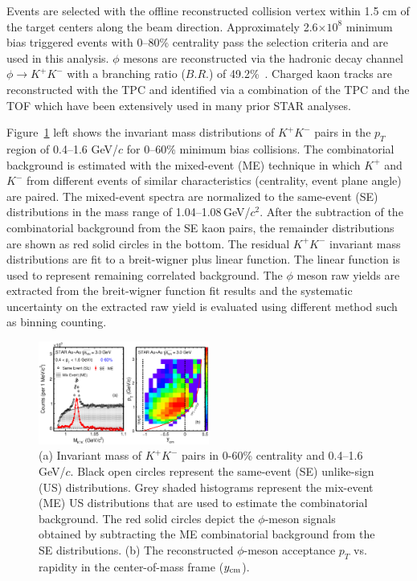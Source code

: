 \documentclass[%
 reprint,	
showpacs,
 amsmath,amssymb,
 aps,
 prc,
]{revtex4-1}
\begin{document}
Events are selected with the offline reconstructed collision vertex within 1.5 cm of the target centers along the beam direction. Approximately 2.6$\times 10^{8}$ minimum bias triggered events with 0--80\% centrality pass the selection criteria and are used in this analysis. $\phi$ mesons are reconstructed via the hadronic decay channel $\phi\rightarrow K^+K^-$ with a branching ratio ($B.R.$) of 49.2\%~\cite{pdg}. Charged kaon tracks are reconstructed with the TPC and identified via a combination of the TPC and the TOF which have been extensively used in many prior STAR analyses. 


Figure~\ref{fig:phiSignal} left shows the invariant mass distributions of $K^+K^-$ pairs in the $p_{T}$ region of 0.4--1.6 GeV/$c$ for 0--60\% minimum bias collisions. The combinatorial background is estimated with the mixed-event (ME) technique in which $K^+$ and $K^-$ from different events of similar characteristics (centrality, event plane angle) are paired. The mixed-event spectra are normalized to the same-event (SE) distributions in the mass range of 1.04--1.08\,GeV/$c^2$. After the subtraction of the combinatorial background from the SE kaon pairs, the remainder distributions are shown as red solid circles in the bottom. The residual $K^+K^-$ invariant mass distributions are fit to a breit-wigner plus linear function. The linear function is used to represent remaining correlated background. The $\phi$ meson raw yields are extracted from the breit-wigner function fit results and the systematic uncertainty on the extracted raw yield is evaluated using different method such as binning counting.


\begin{figure}
\centering
\includegraphics[width=0.50\textwidth]{fig/fig1_signal.eps}
  \caption{(a) Invariant mass of $K^+K^-$ pairs in 0-60\% centrality and 0.4--1.6\,GeV/$c$. Black open circles represent the same-event (SE) unlike-sign (US) distributions. Grey shaded histograms represent the mix-event (ME) US distributions that are used to estimate the combinatorial background. The red solid circles depict the $\phi$-meson signals obtained by subtracting the ME combinatorial background from the SE distributions. (b) The reconstructed $\phi$-meson acceptance $p_T$ vs. rapidity in the center-of-mass frame ($y_{\rm cm}$).}
\label{fig:phiSignal} 
\end{figure}
\end{document}

